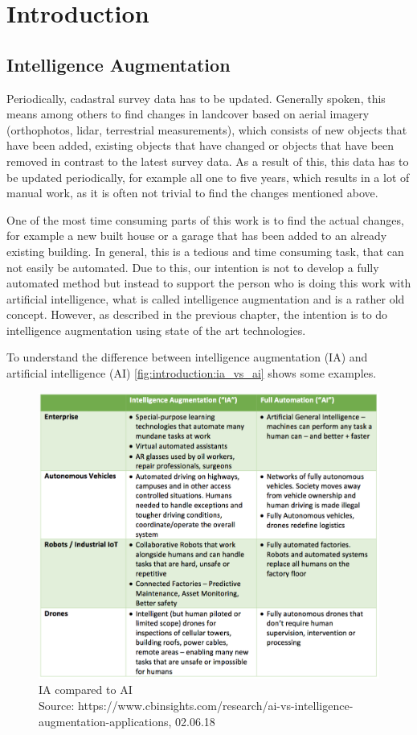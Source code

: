 
\chapter{Introduction}\label{chp:introduction}
\section{Intelligence Augmentation}
Periodically, cadastral survey data has to be updated. Generally spoken, this means among others to find changes in landcover based on aerial imagery (orthophotos, lidar, terrestrial measurements), which consists of new objects that have been added, existing objects that have changed or objects that have been removed in contrast to the latest survey data. As a result of this, this data has to be updated periodically, for example all one to five years, which results in a lot of manual work, as it is often not trivial to find the changes mentioned above.

One of the most time consuming parts of this work is to find the actual changes, for example a new built house or a garage that has been added to an already existing building. In general, this is a tedious and time consuming task, that can not easily be automated. Due to this, our intention is not to develop a fully automated method but instead to support the person who is doing this work with artificial intelligence, what is called intelligence augmentation \cite{Engelbart.1962} and is a rather old concept. However, as described in the previous chapter, the intention is to do intelligence augmentation using state of the art technologies.

To understand the difference between intelligence augmentation (IA) and artificial intelligence (AI) \autoref{fig:introduction:ia_vs_ai} shows some examples.

\begin{figure}[H]
    \centering
	\includegraphics[width=0.9\linewidth]{chapters/introduction/images/ia_vs_ai.png}
	\caption{IA compared to AI\\Source: https://www.cbinsights.com/research/ai-vs-intelligence-augmentation-applications, 02.06.18}
	\label{fig:introduction:ia_vs_ai}
\end{figure}

